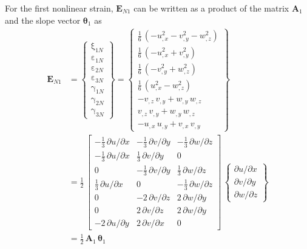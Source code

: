 For the first nonlinear strain, $\mathbf{E}_{N1}$ can be written as a product of the matrix $\mathbf{A}_1$ and the slope vector $\boldsymbol{\theta}_1$ as
\begin{equation}
\begin{aligned}
\mathbf{E}_{N1} & =  \begin{Bmatrix}
\mathrm \xi_{1N} \\
\mathrm \varepsilon_{1N} \\
\mathrm \varepsilon_{2N} \\
\mathrm \varepsilon_{3N} \\
\mathrm \gamma_{1N} \\
\mathrm \gamma_{2N} \\
\mathrm \gamma_{3N} \end{Bmatrix} =
\begin{Bmatrix}
\tfrac{1}{6} \,  \left( -u_{,x}^2 - v_{,y}^2  -  w_{,z}^2  \right)\\
\tfrac{1}{6} \,  \left( -u_{,x}^2 +  v_{,y}^2 \right) \\
\tfrac{1}{6} \,  \left( - v_{,y}^2 + w_{,z}^2 \right) \\
\tfrac{1}{6} \,  \left( u_{,x}^2 -  w_{,z}^2  \right) \\ 
 -v_{,z} \, v_{,y} + w_{,y} \, w_{,z} \\
 v_{,z} \, v_{,y} + w_{,y} \, w_{,z}\\ 
- u_{,x} \, u_{,y} + v_{,x} \, v_{,y}\end{Bmatrix} \\
& = \frac{1}{2} \, \begin{bmatrix}
-\tfrac{1}{3} \, \partial u / \partial x &  - \tfrac{1}{3} \, \partial v / \partial y & -\tfrac{1}{3} \, \partial w / \partial z  \\
-\tfrac{1}{3} \, \partial u / \partial x &  \tfrac{1}{3} \, \partial v / \partial y & 0  \\
0  & -\tfrac{1}{3} \, \partial v / \partial y & \tfrac{1}{3} \, \partial w / \partial z \\
\tfrac{1}{3} \, \partial u / \partial x &  0 & - \tfrac{1}{3} \, \partial w / \partial z  \\
0 &  - 2 \, \partial v / \partial z &  2 \,  \partial w / \partial y  \\
0 &  2 \, \partial v / \partial z  & 2 \,  \partial w / \partial y  \\
- 2 \, \partial u / \partial y &   2 \, \partial v / \partial x & 0   \end{bmatrix} \, \begin{Bmatrix}
\partial u / \partial x\\
\partial v / \partial y \\
\partial w / \partial z
\end{Bmatrix} \\
& = \tfrac{1}{2} \, \mathbf{A}_1 \, \boldsymbol{\theta}_1
\end{aligned}
\end{equation}
